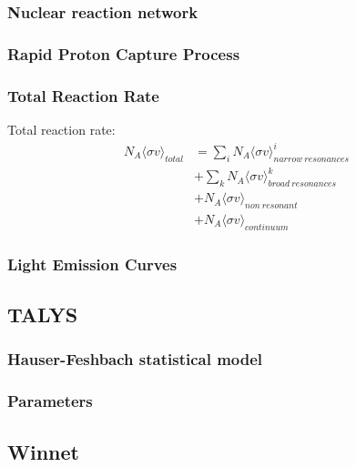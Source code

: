 \documentclass[final]{thesis} %
\begin{document}
\subsubsection{Nuclear reaction network}
\label{sec:nrn}

\subsubsection{Rapid Proton Capture Process}
\label{sec:rpprocess}

\subsubsection{Total Reaction Rate}
\label{sec:trr}
Total reaction rate:
\begin{equation}
\begin{aligned}
	N_{A} \langle \sigma v \rangle_{total} &= \sum_{i} N_{A} \langle \sigma v \rangle_{narrow\:resonances}^{i} \\ 
	&+ \sum_{k} N_{A} \langle \sigma v \rangle_{broad\:resonances}^{k} \\ 
	&+ N_{A} \langle \sigma v \rangle_{non\:resonant} \\ 
	&+ N_{A} \langle \sigma v \rangle_{continuum}
\end{aligned}
\end{equation}
\subsubsection{Light Emission Curves}
\label{sec:lec}

\subsection{TALYS}
\label{sec:talys}

\subsubsection{Hauser-Feshbach statistical model}
\label{sec:HFsm}

\subsubsection{Parameters}
\label{sec:tparams}

\subsection{Winnet}
\label{sec:winnet}
\end{document}
